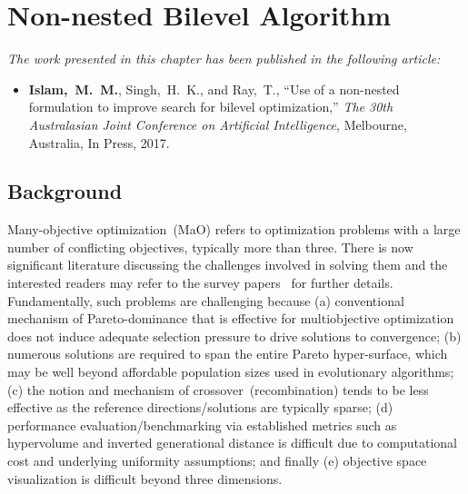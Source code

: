 \chapter{Non-nested Bilevel Algorithm}

 
\begin{tcolorbox}
\textit{The work presented in this chapter has been published in the following article:}
\begin{itemize}
\item \textbf{Islam,~M.~M.}, {Singh,~H.~K.}, and {Ray,~T.}, ``Use of a non-nested formulation to improve search for bilevel optimization,'' {\em The 30th  Australasian Joint Conference on Artificial Intelligence}, Melbourne, Australia, In Press, 2017.
\end{itemize}
\end{tcolorbox}

\section{Background}

Many-objective optimization~(MaO) refers to optimization problems with a large number of conflicting objectives, typically more than three. There is now significant literature discussing the challenges involved in solving them and the interested readers may refer to the survey papers~\cite{lucken2014survey,li2015many,trivedisurvey} for further details. Fundamentally, such problems are challenging because (a) conventional mechanism of Pareto-dominance that is effective for multiobjective optimization does not induce adequate selection pressure to drive solutions to convergence; (b) numerous solutions are required to span the entire Pareto hyper-surface, which may be well beyond affordable population sizes used in evolutionary algorithms; (c) the notion and mechanism of crossover~(recombination) tends to be less effective as the reference directions/solutions are typically sparse; (d) performance evaluation/benchmarking via established metrics such as hypervolume and inverted generational distance is difficult due to computational cost and underlying uniformity assumptions; and finally (e) objective space visualization is difficult beyond three dimensions.

